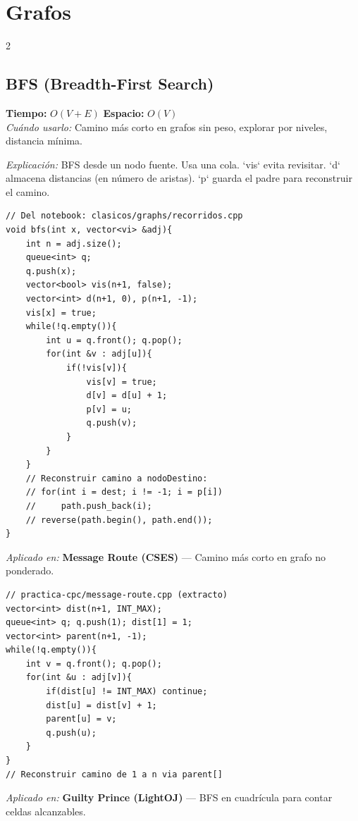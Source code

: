 \documentclass[10pt,a4paper]{article}
\begin{document}
\section{Grafos}
\begin{multicols}{2}

\subsection{BFS (Breadth-First Search)}
\textbf{Tiempo:} $O(V + E)$ \quad \textbf{Espacio:} $O(V)$\\
\textit{Cu\'ando usarlo:} Camino m\'as corto en grafos sin peso, explorar por niveles, distancia m\'inima.

\textit{Explicación:} BFS desde un nodo fuente. Usa una cola. `vis` evita revisitar. `d` almacena distancias (en número de aristas). `p` guarda el padre para reconstruir el camino.

\begin{lstlisting}
// Del notebook: clasicos/graphs/recorridos.cpp
void bfs(int x, vector<vi> &adj){
    int n = adj.size();
    queue<int> q;
    q.push(x);
    vector<bool> vis(n+1, false);
    vector<int> d(n+1, 0), p(n+1, -1);
    vis[x] = true;
    while(!q.empty()){
        int u = q.front(); q.pop();
        for(int &v : adj[u]){
            if(!vis[v]){
                vis[v] = true;
                d[v] = d[u] + 1;
                p[v] = u;
                q.push(v);
            }
        }
    }
    // Reconstruir camino a nodoDestino:
    // for(int i = dest; i != -1; i = p[i])
    //     path.push_back(i);
    // reverse(path.begin(), path.end());
}
\end{lstlisting}

\textit{Aplicado en:} \textbf{Message Route (CSES)} --- Camino m\'as corto en grafo no ponderado.

\begin{lstlisting}
// practica-cpc/message-route.cpp (extracto)
vector<int> dist(n+1, INT_MAX);
queue<int> q; q.push(1); dist[1] = 1;
vector<int> parent(n+1, -1);
while(!q.empty()){
    int v = q.front(); q.pop();
    for(int &u : adj[v]){
        if(dist[u] != INT_MAX) continue;
        dist[u] = dist[v] + 1;
        parent[u] = v;
        q.push(u);
    }
}
// Reconstruir camino de 1 a n via parent[]
\end{lstlisting}

\textit{Aplicado en:} \textbf{Guilty Prince (LightOJ)} --- BFS en cuadr\'icula para contar celdas alcanzables.


\end{multicols}
\end{document}

